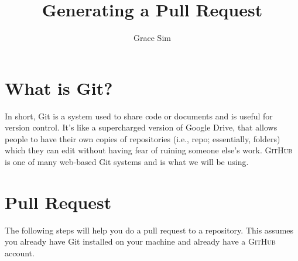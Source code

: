 \documentclass[11pt]{article}
\title{Generating a Pull Request}
\author{Grace Sim}
\date{}
\begin{document}
\maketitle
\section*{What is Git?}
In short, Git is a system used to share code or documents and is useful for version control. It's like a supercharged version of Google Drive, that allows people to have their own copies of repositories (i.e., repo; essentially, folders) which they can edit without having fear of ruining someone else's work. \textsc{GitHub} is one of many web-based Git systems and is what we will be using.

\section*{Pull Request}
The following steps will help you do a pull request to a repository. This assumes you already have Git installed on your machine and already have a \textsc{GitHub} account.
\end{document}
